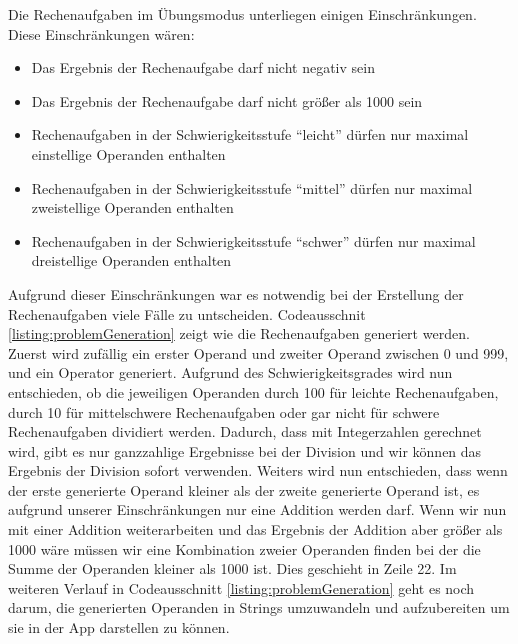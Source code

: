 Die Rechenaufgaben im Übungsmodus unterliegen einigen Einschränkungen. Diese Einschränkungen wären:
\begin{itemize}
\item Das Ergebnis der Rechenaufgabe darf nicht negativ sein
\item Das Ergebnis der Rechenaufgabe darf nicht größer als 1000 sein
\item Rechenaufgaben in der Schwierigkeitsstufe \enquote{leicht} dürfen nur maximal einstellige Operanden enthalten
\item Rechenaufgaben in der Schwierigkeitsstufe \enquote{mittel} dürfen nur maximal zweistellige Operanden enthalten
\item Rechenaufgaben in der Schwierigkeitsstufe \enquote{schwer} dürfen nur maximal dreistellige Operanden enthalten
\end{itemize}
Aufgrund dieser Einschränkungen war es notwendig bei der Erstellung der Rechenaufgaben viele 
Fälle zu untscheiden. Codeausschnit \ref{listing:problemGeneration} zeigt wie die Rechenaufgaben
generiert werden.
Zuerst wird zufällig ein erster Operand und zweiter Operand zwischen 0 und 999, und ein Operator 
generiert. Aufgrund des Schwierigkeitsgrades wird nun entschieden, ob die jeweiligen Operanden durch
100 für leichte Rechenaufgaben, durch 10 für mittelschwere Rechenaufgaben oder gar nicht für schwere
Rechenaufgaben dividiert werden. Dadurch, dass mit Integerzahlen gerechnet wird, gibt es nur ganzzahlige
Ergebnisse bei der Division und wir können das Ergebnis der Division sofort verwenden.
Weiters wird nun entschieden, dass wenn der erste generierte Operand kleiner als der zweite generierte Operand 
ist, es aufgrund unserer Einschränkungen nur eine Addition werden darf. Wenn wir nun mit einer 
Addition weiterarbeiten und das Ergebnis der Addition aber größer als 1000 wäre müssen wir eine Kombination 
zweier Operanden finden bei der die Summe der Operanden kleiner als 1000 ist. Dies geschieht in Zeile 22.
Im weiteren Verlauf in Codeausschnitt \ref{listing:problemGeneration} geht es noch darum, die generierten
Operanden in Strings umzuwandeln und aufzubereiten um sie in der App darstellen zu können.


